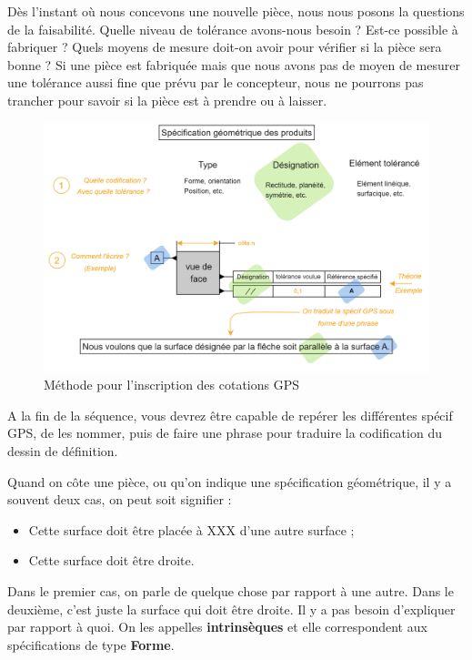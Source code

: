 \documentclass[
	11pt, %
	fleqn, %
	a4paper, %
]{LegrandOrangeBook}
\begin{document}
Dès l'instant où nous concevons une nouvelle pièce, nous nous posons la questions de la faisabilité. Quelle niveau de tolérance avons-nous besoin ? Est-ce possible à fabriquer ? Quels moyens de mesure doit-on avoir pour vérifier si la pièce sera bonne ? Si une pièce est fabriquée mais que nous avons pas de moyen de mesurer une tolérance aussi fine que prévu par le concepteur, nous ne pourrons pas trancher pour savoir si la pièce est à prendre ou à laisser.\\


\begin{figure}[H] %
	\centering %
	\includegraphics[width=1.15\textwidth]{Images/diag12.png} 
	\caption{Méthode pour l'inscription des cotations GPS}
	\label{diag12} %
\end{figure}

A la fin de la séquence, vous devrez être capable de repérer les différentes spécif GPS, de les nommer, puis de faire une phrase pour traduire la codification du dessin de définition. 


\begin{theorem}
    Quand on côte une pièce, ou qu'on indique une spécification géométrique, il y a souvent deux cas, on peut soit signifier :
    \begin{itemize}
        \item Cette surface doit être placée à XXX d'une autre surface ;
        \item Cette surface doit être droite.
    \end{itemize}
Dans le premier cas, on parle de quelque chose par rapport à une autre. Dans le deuxième, c'est juste la surface qui doit être droite. Il y a pas besoin d'expliquer par rapport à quoi. On les appelles \textbf{intrinsèques} et elle correspondent aux spécifications de type \textbf{Forme}.

\end{theorem}
\end{document}
